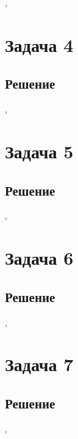 \documentclass[a4paper,12pt]{article}
\begin{document}
	
	\sep	
	
	\section*{Задача 4}

	\subsection*{Решение}


	\sep	
	
	\section*{Задача 5}
	
	\subsection*{Решение}
	
	

	\sep	
		
		
	\section*{Задача 6}

	
	\subsection*{Решение}
	


	\sep		
	
	
	
	
	\section*{Задача 7}

	
	\subsection*{Решение}
	


	\sep	
	
	
	
	
\end{document}
